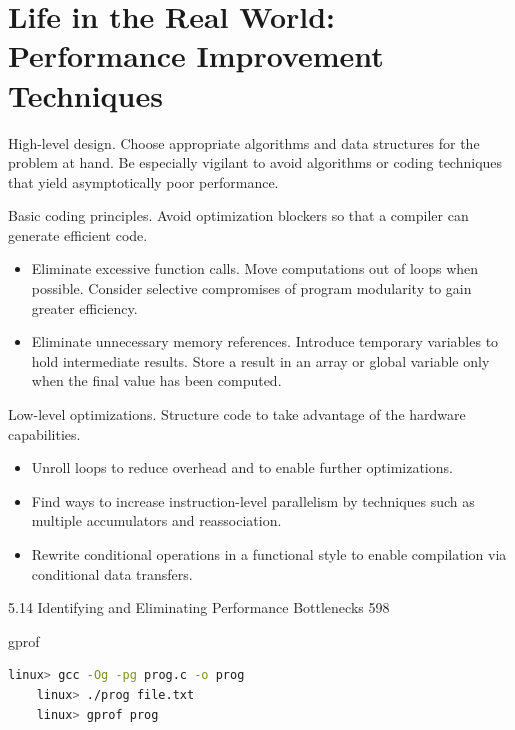 \section{Life in the Real World: Performance Improvement Techniques}

\textrm{High-level design.} Choose appropriate algorithms and data structures for the problem at hand. Be especially vigilant to avoid algorithms or coding techniques that yield asymptotically poor performance.

\textrm{Basic coding principles.} Avoid optimization blockers so that a compiler can generate efficient code.
\begin{itemize}
    \item Eliminate excessive function calls. Move computations out of loops when possible. Consider selective compromises of program modularity to gain greater efficiency.
    \item Eliminate unnecessary memory references. Introduce temporary variables to hold intermediate results. Store a result in an array or global variable only when the final value has been computed.
\end{itemize}

\textrm{Low-level optimizations.} Structure code to take advantage of the hardware capabilities.
\begin{itemize}
    \item Unroll loops to reduce overhead and to enable further optimizations.
    \item Find ways to increase instruction-level parallelism by techniques such as multiple accumulators and reassociation.
    \item Rewrite conditional operations in a functional style to enable compilation via conditional data transfers.
\end{itemize}


5.14 Identifying and Eliminating Performance Bottlenecks 598


gprof

\begin{lstlisting}[language=bash]
    linux> gcc -Og -pg prog.c -o prog
    linux> ./prog file.txt
    linux> gprof prog
\end{lstlisting}

